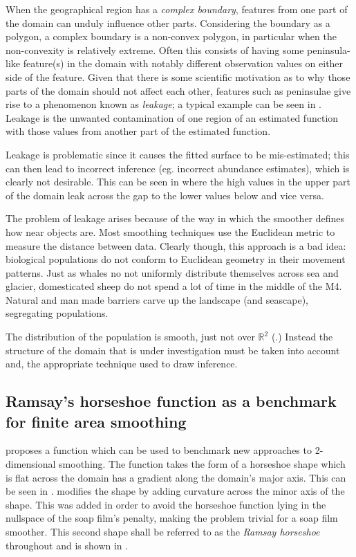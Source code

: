 When the geographical region has a \emph{complex boundary}, features from one part of the domain can unduly influence other parts. Considering the boundary as a polygon, a complex boundary is a non-convex polygon, in particular when the non-convexity is relatively extreme. Often this consists of having some peninsula-like feature(s) in the domain with notably different observation values on either side of the feature. Given that there is some scientific motivation as to why those parts of the domain should not affect each other, features such as peninsulae give rise to a phenomenon known as \emph{leakage}; a typical example can be seen in . Leakage is the unwanted contamination of one region of an estimated function with those values from another part of the estimated function.

Leakage is problematic since it causes the fitted surface to be mis-estimated; this can then lead to incorrect inference (eg. incorrect abundance estimates), which is clearly not desirable. This can be seen in  where the high values in the upper part of the domain leak across the gap to the lower values below and vice versa.

The problem of leakage arises because of the way in which the smoother defines how near objects are. Most smoothing techniques use the Euclidean metric to measure the distance between data. Clearly though, this approach is a bad idea: biological populations do not conform to Euclidean geometry in their movement patterns. Just as whales no not uniformly distribute themselves across sea and glacier, domesticated sheep do not spend a lot of time in the middle of the M4. Natural and man made barriers carve up the landscape (and seascape), segregating populations.

The distribution of the population is smooth, just not over $\mathbb{R}^2$ (\cite{wangranalli}.) Instead the structure of the domain that is under investigation must be taken into account and, the appropriate technique used to draw inference.

\subsection{Ramsay's horseshoe function as a benchmark for finite area smoothing}

\cite{ramsay} proposes a function which can be used to benchmark new approaches to 2-dimensional smoothing. The function takes the form of a horseshoe shape which is flat across the domain has a gradient along the domain's major axis. This can be seen in . \cite{soap} modifies the shape by adding curvature across the minor axis of the shape. This was added in order to avoid the horseshoe function lying in the nullspace of the soap film's penalty, making the problem trivial for a soap film smoother. This second shape shall be referred to as the \emph{Ramsay horseshoe} throughout and is shown in .

